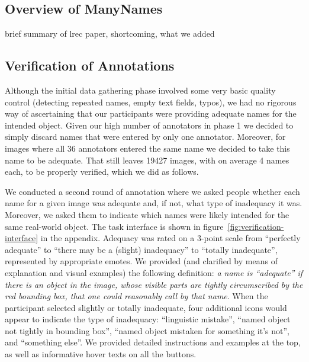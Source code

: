 

\subsection{Overview of ManyNames}
\label{sect:mn_overview}

brief summary of lrec paper, shortcoming, what we added

\subsection{Verification of Annotations}
\label{sect:mn_verification}


Although the initial data gathering phase involved some very basic quality control (detecting repeated names, empty text fields, typos), we had no rigorous way of ascertaining that our participants were providing adequate names for the intended object.
Given our high number of annotators in phase 1 we decided to simply discard names that were entered by only one annotator.
Moreover, for images where all 36 annotators entered the same name we decided to take this name to be adequate. 
That still leaves 19427 images, with on average 4 names each, to be properly verified, which we did as follows.

We conducted a second round of annotation where we asked people whether each name for a given image was adequate and, if not, what type of inadequacy it was.
Moreover, we asked them to indicate which names were likely intended for the same real-world object.
The task interface is shown in figure~\ref{fig:verification-interface} in the appendix.
Adequacy was rated on a 3-point scale from ``perfectly adequate'' to ``there may be a (slight) inadequacy'' to ``totally inadequate'', represented by appropriate emotes.
We provided (and clarified by means of explanation and visual examples) the following definition: \textit{a name is ``adequate'' if there is an object in the image, whose visible parts are tightly circumscribed by the red bounding box, that one could reasonably call by that name}.
When the participant selected slightly or totally inadequate, four additional icons would appear to indicate the type of inadequacy: ``linguistic mistake'', ``named object not tightly in bounding box'', ``named object mistaken for something it's not'', and ``something else''.
We provided detailed instructions and examples at the top, as well as informative hover texts on all the buttons.

